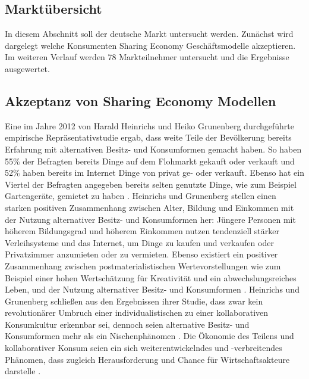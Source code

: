 \documentclass[a4paper]{scrartcl}
\begin{document}
\begin{multicols}{2}
	
	
	\section{Markt\"ubersicht}
		In diesem Abschnitt soll der deutsche Markt untersucht werden. Zun\"achst wird dargelegt welche Konsumenten Sharing Economy Gesch\"aftsmodelle akzeptieren. Im weiteren Verlauf werden 78 Markteilnehmer untersucht und die Ergebnisse ausgewertet.
	
		\subsection{Akzeptanz von Sharing Economy Modellen}
			Eine im Jahre 2012 von Harald Heinrichs und Heiko Grunenberg durchgef\"uhrte empirische Repr\"asentativstudie ergab, dass weite Teile der Bev\"olkerung bereits Erfahrung mit alternativen Besitz- und Konsumformen gemacht haben. So haben 55\% der Befragten bereits Dinge auf dem Flohmarkt gekauft oder verkauft und 52\% haben bereits im Internet Dinge von privat ge- oder verkauft. Ebenso hat ein Viertel der Befragten angegeben bereits selten genutzte Dinge, wie zum Beispiel Gartenger\"ate, gemietet zu haben \cite{heinrichs2012}. Heinrichs und Grunenberg stellen einen starken positiven Zusammenhang zwischen Alter, Bildung und Einkommen mit der Nutzung alternativer Besitz- und Konsumformen her: J\"ungere Personen mit h\"oherem Bildungsgrad und h\"oherem Einkommen nutzen tendenziell st\"arker Verleihsysteme und das Internet, um Dinge zu kaufen und verkaufen oder Privatzimmer anzumieten oder zu vermieten. Ebenso existiert ein positiver Zusammenhang zwischen postmaterialistischen Wertevorstellungen wie zum Beispiel einer hohen Wertsch\"atzung f\"ur Kreativit\"at und ein abwechslungsreiches Leben, und der Nutzung alternativer Besitz- und Konsumformen \cite{heinrichs2012}. Heinrichs und Grunenberg schlie\ss en aus den Ergebnissen ihrer Studie, dass zwar kein {\glqq revolution\"arer Umbruch einer individualistischen zu einer kollaborativen Konsumkultur\grqq} erkennbar sei, dennoch seien alternative Besitz- und Konsumformen mehr als ein Nischenph\"anomen \cite{heinrichs2012}. Die \"Okonomie des Teilens und kollaborativer Konsum seien ein sich weiterentwickelndes und -verbreitendes Ph\"anomen, dass zugleich Herausforderung und Chance f\"ur Wirtschaftsakteure darstelle \cite{heinrichs2012}.
		

\end{multicols}
\end{document}

